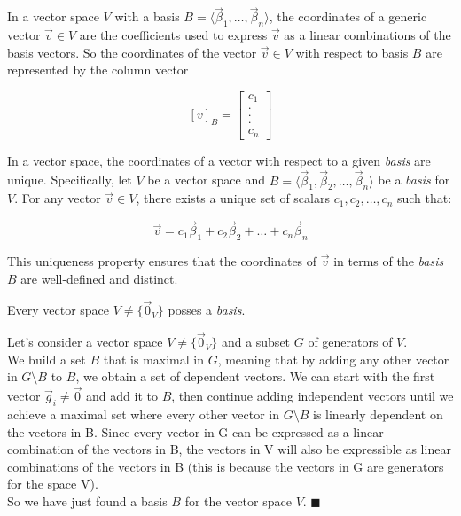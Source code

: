 \begin{tcolorbox}[colback=def_color,colframe=gray] \begin{definition}
    In a vector space $V$ with a basis $B = \langle\vec \beta_1, \dots, \vec \beta_n \rangle$, the coordinates of a generic vector $\vec v \in V$ are the coefficients used to express $\vec v$ as a linear combinations of the basis vectors. So the coordinates of the vector $\vec v \in V$ with respect to basis $B$ are represented by the column vector 

    $$
    [v]_B = \begin{bmatrix}
        c_1 \\
        .\\
        .\\
        .\\
        c_n
    \end{bmatrix}
    $$
\end{definition}
\end{tcolorbox}

In a vector space, the coordinates of a vector with respect to a given \emph{basis} are unique. Specifically, let $V$ be a vector space and $B = \langle \vec{\beta}_1, \vec{\beta}_2, \ldots, \vec{\beta}_n\rangle$ be a \emph{basis} for $V$. For any vector $\vec{v} \in V$, there exists a unique set of scalars $c_1, c_2, \ldots, c_n$ such that:

$$
\vec{v} = c_1 \vec{\beta}_1 + c_2 \vec{\beta}_2 + \ldots + c_n \vec{\beta}_n
$$

This uniqueness property ensures that the coordinates of $\vec{v}$ in terms of the \emph{basis} $B$ are well-defined and distinct.
\\

\begin{proposition}
Every vector space $V \neq \{\vec{0}_V\}$ posses a \emph{basis}.
\end{proposition}


\begin{tcolorbox}[colback=def_color,coltitle=black,coltext=black,colframe=pro_color_back,title=\textbf{Proof}]

Let's consider a vector space $V \neq \{\vec{0}_V\}$ and a subset $G$ of generators of $V$.
\\

We build a set $B$ that is maximal in $G$, meaning that by adding any other vector in $G \setminus B$ to $B$, we obtain a set of dependent vectors. We can start with the first vector $\vec g_i \neq \vec 0$ and add it to $B$, then continue adding independent vectors until we achieve a maximal set where every other vector in $G \setminus B$ is linearly dependent on the vectors in B. Since every vector in G can be expressed as a linear combination of the vectors in B, the vectors in V will also be expressible as linear combinations of the vectors in B (this is because the vectors in G are generators for the space V).
\\

So we have just found a basis $B$ for the vector space $V$. $\blacksquare$
\end{tcolorbox}


